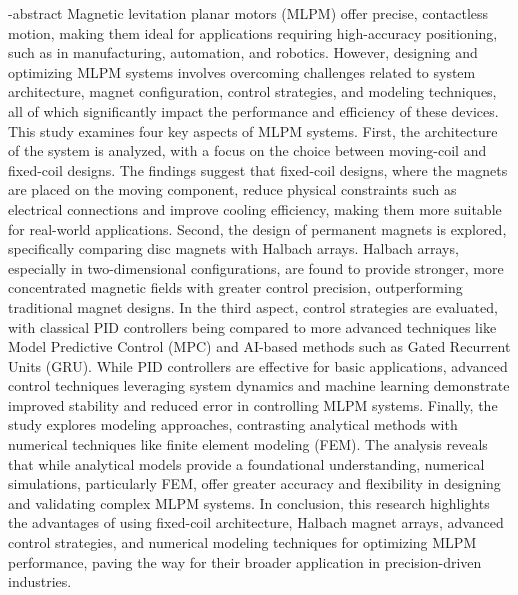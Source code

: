 
\en-abstract{
Magnetic levitation planar motors (MLPM) offer precise, contactless motion, making them ideal for applications requiring high-accuracy positioning, such as in manufacturing, automation, and robotics. However, designing and optimizing MLPM systems involves overcoming challenges related to system architecture, magnet configuration, control strategies, and modeling techniques, all of which significantly impact the performance and efficiency of these devices.
This study examines four key aspects of MLPM systems. First, the architecture of the system is analyzed, with a focus on the choice between moving-coil and fixed-coil designs. The findings suggest that fixed-coil designs, where the magnets are placed on the moving component, reduce physical constraints such as electrical connections and improve cooling efficiency, making them more suitable for real-world applications. Second, the design of permanent magnets is explored, specifically comparing disc magnets with Halbach arrays. Halbach arrays, especially in two-dimensional configurations, are found to provide stronger, more concentrated magnetic fields with greater control precision, outperforming traditional magnet designs.
In the third aspect, control strategies are evaluated, with classical PID controllers being compared to more advanced techniques like Model Predictive Control (MPC) and AI-based methods such as Gated Recurrent Units (GRU). While PID controllers are effective for basic applications, advanced control techniques leveraging system dynamics and machine learning demonstrate improved stability and reduced error in controlling MLPM systems.
Finally, the study explores modeling approaches, contrasting analytical methods with numerical techniques like finite element modeling (FEM). The analysis reveals that while analytical models provide a foundational understanding, numerical simulations, particularly FEM, offer greater accuracy and flexibility in designing and validating complex MLPM systems.
In conclusion, this research highlights the advantages of using fixed-coil architecture, Halbach magnet arrays, advanced control strategies, and numerical modeling techniques for optimizing MLPM performance, paving the way for their broader application in precision-driven industries.
}
